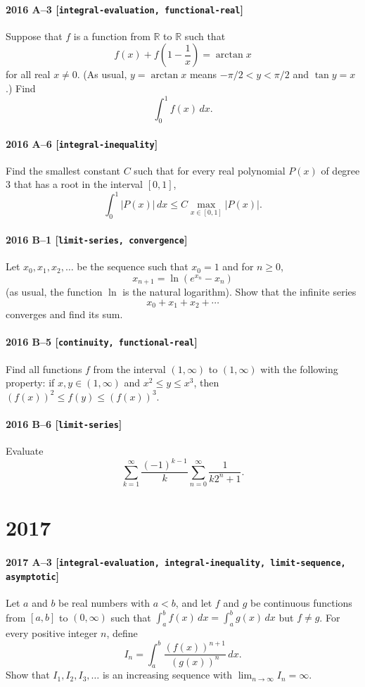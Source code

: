 \documentclass[11pt]{article}
\begin{document}
\paragraph{2016 A--3 \textnormal{[\texttt{integral-evaluation, functional-real}]}}
Suppose that $f$ is a function from $\mathbb{R}$ to $\mathbb{R}$ such that
\[
f(x) + f\left( 1 - \frac{1}{x} \right) = \arctan x
\]
for all real $x \neq 0$. (As usual, $y = \arctan x$ means $-\pi/2 < y < \pi/2$ and $\tan y = x$.) Find
\[
\int_0^1 f(x)\,dx.
\]

\paragraph{2016 A--6 \textnormal{[\texttt{integral-inequality}]}}
Find the smallest constant $C$ such that for every real polynomial $P(x)$ of degree 3 that has a root in the interval $[0,1]$,
\[
\int_0^1 \left| P(x) \right|\,dx \leq C \max_{x \in [0,1]} \left| P(x) \right|.
\]

\paragraph{2016 B--1 \textnormal{[\texttt{limit-series, convergence}]}}
Let $x_0,x_1,x_2,\dots$ be the sequence such that $x_0=1$ and for $n \geq 0$,
\[
x_{n+1} = \ln(e^{x_n} - x_n)
\]
(as usual, the function $\ln$ is the natural logarithm). Show that the infinite series
\[
x_0 + x_1 + x_2 + \cdots
\]
converges and find its sum.

\paragraph{2016 B--5 \textnormal{[\texttt{continuity, functional-real}]}}
Find all functions $f$ from the interval $(1, \infty)$ to $(1, \infty)$ with the following property:
if $x,y \in (1, \infty)$ and $x^2 \leq y \leq x^3$, then $(f(x))^2 \leq f(y) \leq (f(x))^3$.

\paragraph{2016 B--6 \textnormal{[\texttt{limit-series}]}}
Evaluate
\[
\sum_{k=1}^\infty \frac{(-1)^{k-1}}{k} \sum_{n=0}^\infty \frac{1}{k2^n + 1}.
\]

\section*{2017}

\paragraph{2017 A--3 \textnormal{[\texttt{integral-evaluation, integral-inequality, limit-sequence, asymptotic}]}}
Let $a$ and $b$ be real numbers with $a<b$, and let $f$ and $g$ be continuous functions from $[a,b]$ to $(0, \infty)$
such that $\int_a^b f(x)\,dx = \int_a^b g(x)\,dx$ but $f \neq g$. For every positive integer $n$, define
\[
I_n = \int_a^b \frac{(f(x))^{n+1}}{(g(x))^n}\,dx.
\]
Show that $I_1, I_2, I_3, \dots$ is an increasing sequence with $\lim_{n \to \infty} I_n = \infty$.
\end{document}
